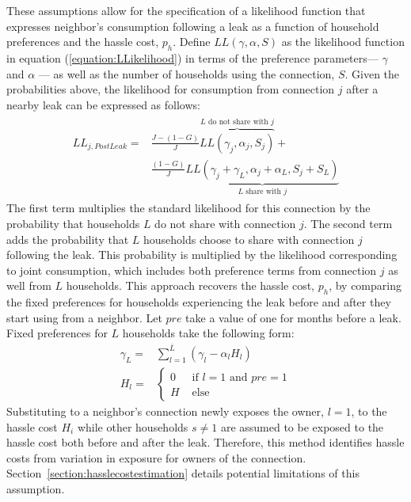 \documentclass[12pt]{article}
\begin{document}
These assumptions allow for the specification of a likelihood function that expresses neighbor's consumption following a leak as a function of household preferences and the hassle cost, $p_h$.  Define $LL(\gamma,\alpha,S)$ as the likelihood function in equation (\ref{equation:LLikelihood}) in terms of the preference parameters--- $\gamma$ and $\alpha$ --- as well as the number of households using the connection, $S$.  Given the probabilities above, the likelihood for consumption from connection $j$ after a nearby leak can be expressed as follows:
\begin{align}\label{equation:hasslelikelihood}
\begin{split}
LL_{j,PostLeak} = & \frac{J-(1-G)}{J} \overbrace{LL(\gamma_j,\alpha_j,S_j)}^{\text{$L$ do not share with $j$}} + \\
	    & \frac{(1-G)}{J}  \underbrace{LL(\gamma_j + \gamma_{L},\alpha_j+\alpha_{L},S_j+S_L)}_{\text{$L$ share with $j$}}
\end{split}
\end{align}
The first term multiplies the standard likelihood for this connection by the probability that households $L$ do not share with connection $j$.  The second term adds the probability that $L$ households choose to share with connection $j$ following the leak.  This probability is multiplied by the likelihood corresponding to joint consumption, which includes both preference terms from connection $j$ as well from $L$ households.  This approach recovers the hassle cost, $p_h$, by comparing the fixed preferences for households experiencing the leak before and after they start using from a neighbor.  Let $pre$ take a value of one for months before a leak.  Fixed preferences for $L$ households take the following form:
\begin{align*}
\gamma_{L} = &  \sum_{l=1}^{\overline{L}} ( \gamma_{l} - \alpha_{l} H_l ) \\
H_{l} = & 
	\begin{cases}
	0     &  \text{ if } l=1 \text{ and } pre=1 \\
	H   &  \text{ else }
	\end{cases}
\end{align*}
Substituting to a neighbor's connection newly exposes the owner, $l=1$, to the hassle cost $H_i$ while other households $s \neq 1$ are assumed to be exposed to the hassle cost both before and after the leak.  Therefore, this method identifies hassle costs from variation in exposure for owners of the connection.  Section~\ref{section:hasslecostestimation} details potential limitations of this assumption.
\end{document}
